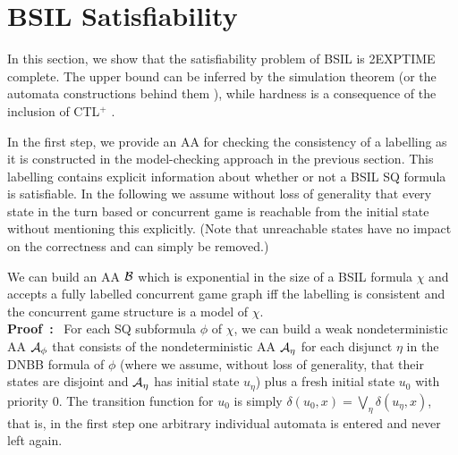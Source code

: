 \documentclass[11pt]{article}
\newcommand{\cala}{{\cal A}}
\newcommand{\calb}{{\cal B}}
\newcommand{\pf}{\noindent\mbox{\bf Proof : }}
\begin{document}
\section{BSIL Satisfiability\label{sec.sat}} 


In this section, we show that the satisfiability problem of BSIL is 2EXPTIME complete.
The upper bound can be inferred by the simulation theorem \cite{MS95} (or the automata constructions behind them \cite{Safra88,Piterman07,Schewe09}), while hardness is a consequence of the inclusion of CTL$^+$ \cite{Wilke99}.

In the first step, 
we provide an AA for checking the consistency of a labelling 
as it is constructed in the model-checking approach in the previous section.
This labelling contains explicit information about whether 
or not a BSIL SQ formula is satisfiable.
In the following we assume without loss of generality 
that every state in the turn based or concurrent game is reachable from 
the initial state without mentioning this explicitly.
(Note that unreachable states have no impact on the correctness 
and can simply be removed.)



{\lemma\label{lemma.sat.B}
We can build an AA $\calb$ 
which is exponential in the size of a BSIL formula $\chi$ 
and accepts a fully labelled concurrent game graph 
iff the labelling is consistent and the concurrent game structure 
is a model of $\chi$.
}
\\\pf 
For each SQ subformula $\phi$ of $\chi$, 
we can build a weak nondeterministic AA 
$\cala_\phi$ that consists of the nondeterministic AA 
$\cala_\eta$ for each disjunct $\eta$ in the DNBB formula of $\phi$ 
(where we assume, without loss of generality, 
that their states are disjoint and 
$\cala_\eta$ has initial state $u_\eta$) 
plus a fresh initial state $u_0$ with priority $0$.
The transition function for $u_0$ is simply
$\delta(u_0,x) = \bigvee_{\eta} \delta(u_\eta,x)$, 
that is, in the first step one arbitrary individual automata 
is entered and never left again.
\end{document}
